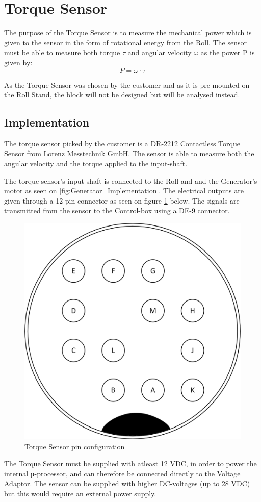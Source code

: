 \section{Torque Sensor}
The purpose of the Torque Sensor is to measure the mechanical power which is given to the sensor in the form of rotational energy from the Roll. The sensor must be able to measure both torque $\tau$ and angular velocity $\omega$ as the power P is given by:
\begin{equation}
	P=\omega\cdot\tau
\end{equation}

As the Torque Sensor was chosen by the customer and as it is pre-mounted on the Roll Stand, the block will not be designed but will be analysed instead.

\subsection{Implementation}
The torque sensor picked by the customer is a DR-2212 Contactless Torque Sensor from Lorenz Messtechnik GmbH. The sensor is able to measure both the angular velocity and the torque applied to the input-shaft.

The torque sensor's input shaft is connected to the Roll and and the Generator's motor as seen on \vref{fig:Generator_Implementation}. The electrical outputs are given through a 12-pin connector as seen on figure \ref{fig:Torque_pins} below. The signals are transmitted from the sensor to the Control-box using a DE-9 connector.

\begin{figure}[H]
	\centering
	\includegraphics[width=0.4\linewidth]{Hardware/Pictures/Torque_Sensor_Pins}
	\caption{Torque Sensor pin configuration}
	\label{fig:Torque_pins}
\end{figure}

The Torque Sensor must be supplied with atleast 12 VDC, in order to power the internal µ-processor, and can therefore be connected directly to the Voltage Adaptor. The sensor can be supplied with higher DC-voltages (up to 28 VDC) but this would require an external power supply.

